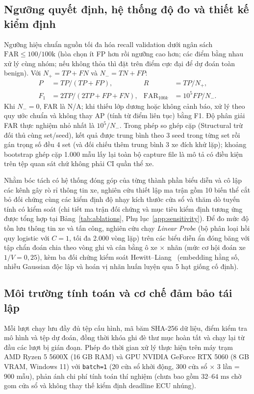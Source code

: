 \documentclass[12pt, a4paper, reqno, oneside]{book}
\DeclareRobustCommand{\code}[1]{\nolinkurl{#1}}
\begin{document}
\subsection{Ngưỡng quyết định, hệ thống độ đo và thiết kế kiểm định}
Ngưỡng hiệu chuẩn nguồn tối đa hóa recall validation dưới ngân sách $\text{FAR} \le 100/100\text{k}$ (hòa chọn ít FP hơn rồi ngưỡng cao hơn; các điểm bằng nhau xử lý cùng nhóm; nếu không thỏa thì đặt trên điểm cực đại để dự đoán toàn benign). Với $N_+=TP+FN$ và $N_-=TN+FP$:
\begin{align}
P&=TP/(TP+FP), & R&=TP/N_+,\\
F_1&=2TP/(2TP+FP+FN), & \operatorname{FAR}_{100k}&=10^5FP/N_-.
\end{align}
Khi $N_-=0$, FAR là N/A; khi thiếu lớp dương hoặc không cảnh báo, xử lý theo quy ước chuẩn và không thay AP (tính từ điểm liên tục) bằng F1. Độ phân giải FAR thực nghiệm nhỏ nhất là $10^5/N_-$. Trong phép so ghép cặp (Structural trừ đối thủ cùng set/seed), kết quả được trung bình theo 3 seed trong từng set rồi gán trọng số đều 4 set (và đối chiếu thêm trung bình 3 xe đích khử lặp); khoảng bootstrap ghép cặp 1.000 mẫu lấy lại toàn bộ capture file là mô tả có điều kiện trên tệp quan sát chứ không phải CI quần thể xe.

Nhằm bóc tách có hệ thống đóng góp của từng thành phần biểu diễn và cô lập các kênh gây rò rỉ thông tin xe, nghiên cứu thiết lập ma trận gồm 10 biến thể cắt bỏ đối chứng cùng các kiểm định độ nhạy kích thước cửa sổ và thăm dò tuyến tính có kiểm soát (chi tiết ma trận đối chứng và mục tiêu kiểm định tương ứng được tổng hợp tại Bảng~\ref{tab:ablations}, Phụ lục~\ref{app:sensitivity}). Để đo mức độ tồn lưu thông tin xe và tấn công, nghiên cứu chạy \textit{Linear Probe} (bộ phân loại hồi quy logistic với $C=1$, tối đa 2.000 vòng lặp) trên các biểu diễn ẩn đóng băng với tập chẩn đoán chia theo vòng ghi và cân bằng ô xe $\times$ nhãn (mức cơ hội đoán xe $1/V=0{,}25$), kèm ba đối chứng kiểm soát Hewitt--Liang~\cite{hewitt2019probes} (embedding hằng số, nhiễu Gaussian độc lập và hoán vị nhãn huấn luyện qua 5 hạt giống cố định).

\subsection{Môi trường tính toán và cơ chế đảm bảo tái lập}
Mỗi lượt chạy lưu đầy đủ tệp cấu hình, mã băm SHA-256 dữ liệu, điểm kiểm tra mô hình và tệp dự đoán, đồng thời khóa ghi đè thư mục hoàn tất và chạy lại từ đầu các lượt bị gián đoạn. Phép đo thời gian xử lý thực hiện trên máy trạm AMD Ryzen 5 5600X (16 GB RAM) và GPU NVIDIA GeForce RTX 5060 (8 GB VRAM, Windows 11) với \code{batch=1} (20 cửa sổ khởi động, 300 cửa sổ $\times$ 3 lần = 900 mẫu), phản ánh chi phí tính toán thí nghiệm (chưa bao gồm $32\text{--}64\text{ ms}$ chờ gom cửa sổ và không thay thế kiểm định deadline ECU nhúng).
\end{document}
